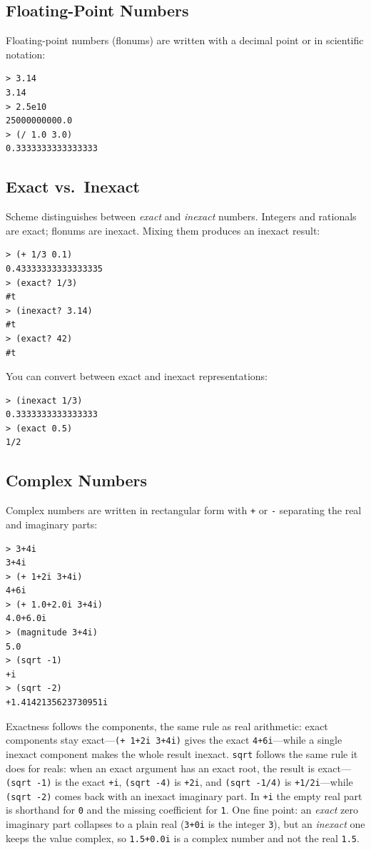 \subsection{Floating-Point Numbers}

Floating-point numbers (flonums) are written with a decimal point or in scientific notation:

\begin{lstlisting}[style=repl]
> 3.14
3.14
> 2.5e10
25000000000.0
> (/ 1.0 3.0)
0.3333333333333333
\end{lstlisting}

\subsection{Exact vs.\ Inexact}

Scheme distinguishes between \emph{exact} and \emph{inexact} numbers. Integers and rationals are exact; flonums are inexact. Mixing them produces an inexact result:

\begin{lstlisting}[style=repl]
> (+ 1/3 0.1)
0.43333333333333335
> (exact? 1/3)
#t
> (inexact? 3.14)
#t
> (exact? 42)
#t
\end{lstlisting}

You can convert between exact and inexact representations:

\begin{lstlisting}[style=repl]
> (inexact 1/3)
0.3333333333333333
> (exact 0.5)
1/2
\end{lstlisting}

\subsection{Complex Numbers}

Complex numbers are written in rectangular form with \texttt{+} or \texttt{-} separating the real and imaginary parts:

\begin{lstlisting}[style=repl]
> 3+4i
3+4i
> (+ 1+2i 3+4i)
4+6i
> (+ 1.0+2.0i 3+4i)
4.0+6.0i
> (magnitude 3+4i)
5.0
> (sqrt -1)
+i
> (sqrt -2)
+1.4142135623730951i
\end{lstlisting}

Exactness follows the components, the same rule as real arithmetic: exact components stay exact---\texttt{(+ 1+2i 3+4i)} gives the exact \texttt{4+6i}---while a single inexact component makes the whole result inexact. \texttt{sqrt} follows the same rule it does for reals: when an exact argument has an exact root, the result is exact---\texttt{(sqrt -1)} is the exact \texttt{+i}, \texttt{(sqrt -4)} is \texttt{+2i}, and \texttt{(sqrt -1/4)} is \texttt{+1/2i}---while \texttt{(sqrt -2)} comes back with an inexact imaginary part. In \texttt{+i} the empty real part is shorthand for \texttt{0} and the missing coefficient for \texttt{1}. One fine point: an \emph{exact} zero imaginary part collapses to a plain real (\texttt{3+0i} is the integer \texttt{3}), but an \emph{inexact} one keeps the value complex, so \texttt{1.5+0.0i} is a complex number and not the real \texttt{1.5}.

